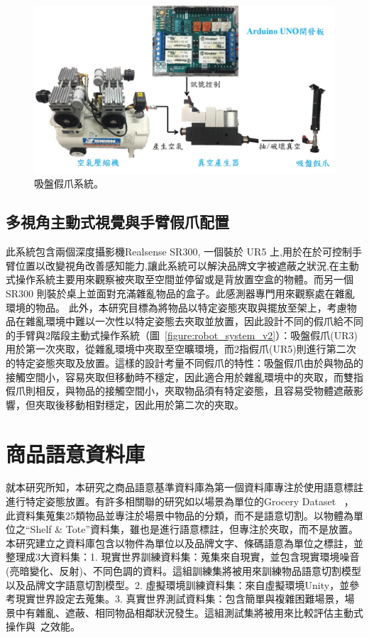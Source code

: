 \begin{figure}[ht]
	\centering
	\includegraphics[height=!, width=1.0\linewidth, keepaspectratio=true]
	{./figures/suction_system.jpg}
  \caption{吸盤假爪系統。}
  \label{figure:suction_gripper}
\end{figure}



\subsection{多視角主動式視覺與手臂假爪配置}
此系統包含兩個深度攝影機Realsense SR300, 一個裝於 UR5 上,用於在於可控制手臂位置以改變視角改善感知能力,讓此系統可以解決品牌文字被遮蔽之狀況,在主動式操作系統主要用來觀察被夾取至空間並停留或是背放置空盒的物體。而另一個 SR300 則裝於桌上並面對充滿雜亂物品的盒子。此感測器專門用來觀察處在雜亂環境的物品。
此外，本研究目標為將物品以特定姿態夾取與擺放至架上，考慮物品在雜亂環境中難以一次性以特定姿態去夾取並放置，因此設計不同的假爪給不同的手臂與2階段主動式操作系統（圖~\ref{figure:robot_system_v2}）：吸盤假爪(UR3)用於第一次夾取，從雜亂環境中夾取至空曠環境，而2指假爪(UR5)則進行第二次的特定姿態夾取及放置。這樣的設計考量不同假爪的特性：吸盤假爪由於與物品的接觸空間小，容易夾取但移動時不穩定，因此適合用於雜亂環境中的夾取，而雙指假爪則相反，與物品的接觸空間小，夾取物品須有特定姿態，且容易受物體遮蔽影響，但夾取後移動相對穩定，因此用於第二次的夾取。


\section{商品語意資料庫}
就本研究所知，本研究之商品語意基準資料庫為第一個資料庫專注於使用語意標註進行特定姿態放置。有許多相關聯的研究如以場景為單位的Grocery Dataset ~\cite{jund2016freiburg}，此資料集蒐集25類物品並專注於場景中物品的分類，而不是語意切割。以物體為單位之``Shelf \& Tote''資料集，雖也是進行語意標註，但專注於夾取，而不是放置。本研究建立之資料庫包含以物件為單位以及品牌文字、條碼語意為單位之標註，並整理成3大資料集：1. 現實世界訓練資料集：蒐集來自現實，並包含現實環境噪音(亮暗變化、反射)、不同色調的資料。這組訓練集將被用來訓練物品語意切割模型以及品牌文字語意切割模型。2. 虛擬環境訓練資料集：來自虛擬環境Unity，並參考現實世界設定去蒐集。3. 真實世界測試資料集：包含簡單與複雜困難場景，場景中有雜亂、遮蔽、相同物品相鄰狀況發生。這組測試集將被用來比較評估主動式操作與~\cite{peterthesis}之效能。

